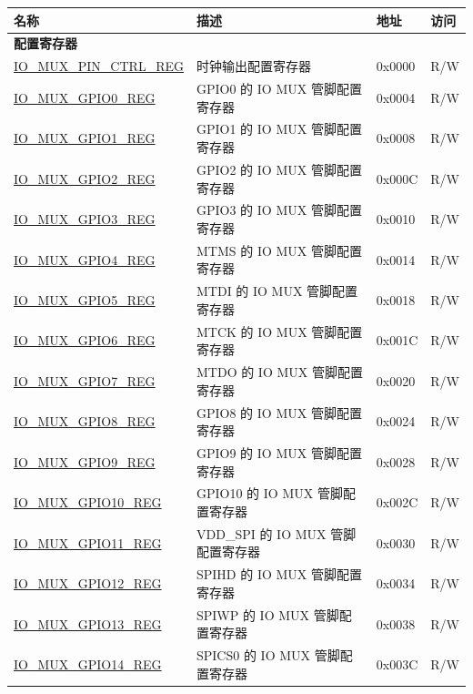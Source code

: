 \begin{longtable}{ | p{6cm} | p{7.2cm} | p{1.3cm} | p{1cm} | }
\hline\rowcolor{lightgray}
名称 & 描述 & 地址 & 访问 \\ \hline
\endhead
\multicolumn{4}{|l|}{\textbf{配置寄存器}} \\ \hline
\hyperref[regdesc:IOMUXPINCTRLREG]{IO\_MUX\_PIN\_CTRL\_REG} & 时钟输出配置寄存器 & 0x0000 & R/W \\ \hline
\hyperref[regdesc:IOMUXGPIONREG]{IO\_MUX\_GPIO0\_REG} & GPIO0 的 IO MUX 管脚配置寄存器 & 0x0004 & R/W \\ \hline
\hyperref[regdesc:IOMUXGPIONREG]{IO\_MUX\_GPIO1\_REG} & GPIO1 的 IO MUX 管脚配置寄存器 & 0x0008 & R/W \\ \hline
\hyperref[regdesc:IOMUXGPIONREG]{IO\_MUX\_GPIO2\_REG} & GPIO2 的 IO MUX 管脚配置寄存器 & 0x000C & R/W \\ \hline
\hyperref[regdesc:IOMUXGPIONREG]{IO\_MUX\_GPIO3\_REG} & GPIO3 的 IO MUX 管脚配置寄存器 & 0x0010 & R/W \\ \hline
\hyperref[regdesc:IOMUXGPIONREG]{IO\_MUX\_GPIO4\_REG} & MTMS 的 IO MUX 管脚配置寄存器 & 0x0014 & R/W \\ \hline
\hyperref[regdesc:IOMUXGPIONREG]{IO\_MUX\_GPIO5\_REG} & MTDI 的 IO MUX 管脚配置寄存器 & 0x0018 & R/W \\ \hline
\hyperref[regdesc:IOMUXGPIONREG]{IO\_MUX\_GPIO6\_REG} & MTCK 的 IO MUX 管脚配置寄存器 & 0x001C & R/W \\ \hline
\hyperref[regdesc:IOMUXGPIONREG]{IO\_MUX\_GPIO7\_REG} & MTDO 的 IO MUX 管脚配置寄存器 & 0x0020 & R/W \\ \hline
\hyperref[regdesc:IOMUXGPIONREG]{IO\_MUX\_GPIO8\_REG} & GPIO8 的 IO MUX 管脚配置寄存器 & 0x0024 & R/W \\ \hline
\hyperref[regdesc:IOMUXGPIONREG]{IO\_MUX\_GPIO9\_REG} & GPIO9 的 IO MUX 管脚配置寄存器 & 0x0028 & R/W \\ \hline
\hyperref[regdesc:IOMUXGPIONREG]{IO\_MUX\_GPIO10\_REG} & GPIO10 的 IO MUX 管脚配置寄存器 & 0x002C & R/W \\ \hline
\hyperref[regdesc:IOMUXGPIONREG]{IO\_MUX\_GPIO11\_REG} & VDD\_SPI 的 IO MUX 管脚配置寄存器 & 0x0030 & R/W \\ \hline
\hyperref[regdesc:IOMUXGPIONREG]{IO\_MUX\_GPIO12\_REG} & SPIHD 的 IO MUX 管脚配置寄存器 & 0x0034 & R/W \\ \hline
\hyperref[regdesc:IOMUXGPIONREG]{IO\_MUX\_GPIO13\_REG} & SPIWP 的 IO MUX 管脚配置寄存器 & 0x0038 & R/W \\ \hline
\hyperref[regdesc:IOMUXGPIONREG]{IO\_MUX\_GPIO14\_REG} & SPICS0 的 IO MUX 管脚配置寄存器 & 0x003C & R/W \\ \hline

\end{longtable}
